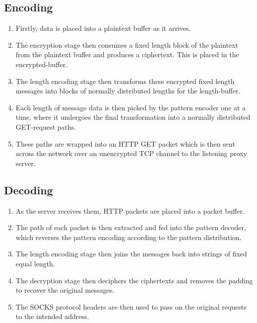 \documentclass[ %
                    author={Samuel Russell},
                supervisor={Prof. Bogdan Warinschi},
                    degree={MEng},
                     title={Innocuous Ciphertexts},
                  subtitle={The DE-CENSOR Scheme},
                      type={research},
                      year={2018} ]{dissertation}
\begin{document}
\subsection{Encoding}

\begin{enumerate}
\item Firstly, data is placed into a plaintext buffer as it arrives.

\item The encryption stage then consumes a fixed length block of the plaintext from the plaintext buffer and produces a ciphertext.
This is placed in the encrypted-buffer.

\item The length encoding stage then transforms these encrypted fixed length messages into blocks of normally distributed lengths for the length-buffer.

\item Each length of message data is then picked by the pattern encoder one at a time, where it undergoes the final transformation into a normally distributed GET-request paths.

\item These paths are wrapped into an HTTP GET packet which is then sent across the network over an unencrypted TCP channel to the listening proxy server.
\end{enumerate}

\subsection{Decoding}

\begin{enumerate}
\item As the server receives them, HTTP packets are placed into a packet buffer.

\item The path of each packet is then extracted and fed into the pattern decoder, which reverses the pattern encoding according to the pattern distribution.

\item The length encoding stage then joins the messages back into strings of fixed equal length.

\item The decryption stage then deciphers the ciphertexts and removes the padding to recover the original messages.

\item The SOCKS protocol headers are then used to pass on the original requests to the intended address.

\end{enumerate}
\end{document}
